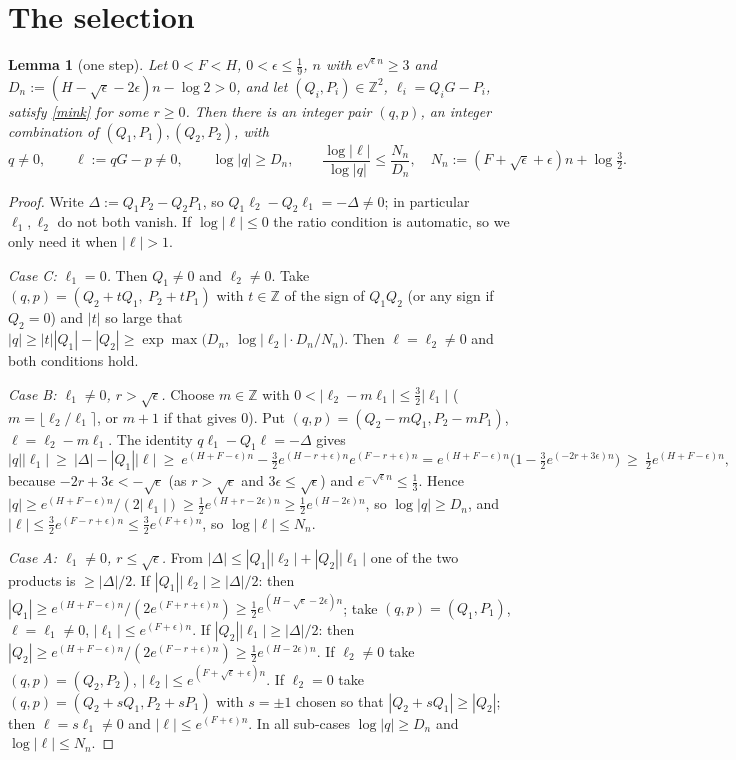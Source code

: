 \documentclass[11pt]{amsart}
\newtheorem{lemma}[theorem]{Lemma}
\theoremstyle{remark}
\newcommand{\Z}{\mathbb Z}\newcommand{\Q}{\mathbb Q}\newcommand{\R}{\mathbb R}
\begin{document}
\section{The selection}
\begin{lemma}[one step]\label{select}
Let $0<F<H$, $0<\epsilon\le\tfrac19$, $n$ with $e^{\sqrt\epsilon n}\ge3$ and $D_n:=(H-\sqrt\epsilon-2\epsilon)n-\log2>0$, and let $(Q_i,P_i)\in\Z^2$, $\ell_i=Q_iG-P_i$, satisfy \eqref{mink} for some $r\ge0$. Then there is an integer pair $(q,p)$, an integer combination of $(Q_1,P_1),(Q_2,P_2)$, with
\[q\ne0,\qquad \ell:=qG-p\ne0,\qquad \log|q|\ge D_n,\qquad \frac{\log|\ell|}{\log|q|}\le\frac{N_n}{D_n},\quad N_n:=(F+\sqrt\epsilon+\epsilon)n+\log\tfrac32 .\]
\end{lemma}
\begin{proof}
Write $\Delta:=Q_1P_2-Q_2P_1$, so $Q_1\ell_2-Q_2\ell_1=-\Delta\ne0$; in particular $\ell_1,\ell_2$ do not both vanish. If $\log|\ell|\le0$ the ratio condition is automatic, so we only need it when $|\ell|>1$.

\emph{Case C: $\ell_1=0$.} Then $Q_1\ne0$ and $\ell_2\ne0$. Take $(q,p)=(Q_2+tQ_1,\ P_2+tP_1)$ with $t\in\Z$ of the sign of $Q_1Q_2$ (or any sign if $Q_2=0$) and $|t|$ so large that $|q|\ge|t||Q_1|-|Q_2|\ge\exp\max\bigl(D_n,\ \log|\ell_2|\cdot D_n/N_n\bigr)$. Then $\ell=\ell_2\ne0$ and both conditions hold.

\emph{Case B: $\ell_1\ne0$, $r>\sqrt\epsilon$.} Choose $m\in\Z$ with $0<|\ell_2-m\ell_1|\le\tfrac32|\ell_1|$ ($m=\lfloor\ell_2/\ell_1\rceil$, or $m+1$ if that gives $0$). Put $(q,p)=(Q_2-mQ_1,P_2-mP_1)$, $\ell=\ell_2-m\ell_1$. The identity $q\ell_1-Q_1\ell=-\Delta$ gives
\[|q||\ell_1|\ \ge\ |\Delta|-|Q_1||\ell|\ \ge\ e^{(H+F-\epsilon)n}-\tfrac32e^{(H-r+\epsilon)n}e^{(F-r+\epsilon)n}=e^{(H+F-\epsilon)n}\bigl(1-\tfrac32e^{(-2r+3\epsilon)n}\bigr)\ \ge\ \tfrac12e^{(H+F-\epsilon)n},\]
because $-2r+3\epsilon<-\sqrt\epsilon$ (as $r>\sqrt\epsilon$ and $3\epsilon\le\sqrt\epsilon$) and $e^{-\sqrt\epsilon n}\le\tfrac13$. Hence $|q|\ge e^{(H+F-\epsilon)n}/(2|\ell_1|)\ge\tfrac12e^{(H+r-2\epsilon)n}\ge\tfrac12e^{(H-2\epsilon)n}$, so $\log|q|\ge D_n$, and $|\ell|\le\tfrac32e^{(F-r+\epsilon)n}\le\tfrac32e^{(F+\epsilon)n}$, so $\log|\ell|\le N_n$.

\emph{Case A: $\ell_1\ne0$, $r\le\sqrt\epsilon$.} From $|\Delta|\le|Q_1||\ell_2|+|Q_2||\ell_1|$ one of the two products is $\ge|\Delta|/2$.
If $|Q_1||\ell_2|\ge|\Delta|/2$: then $|Q_1|\ge e^{(H+F-\epsilon)n}/(2e^{(F+r+\epsilon)n})\ge\tfrac12e^{(H-\sqrt\epsilon-2\epsilon)n}$; take $(q,p)=(Q_1,P_1)$, $\ell=\ell_1\ne0$, $|\ell_1|\le e^{(F+\epsilon)n}$.
If $|Q_2||\ell_1|\ge|\Delta|/2$: then $|Q_2|\ge e^{(H+F-\epsilon)n}/(2e^{(F-r+\epsilon)n})\ge\tfrac12e^{(H-2\epsilon)n}$. If $\ell_2\ne0$ take $(q,p)=(Q_2,P_2)$, $|\ell_2|\le e^{(F+\sqrt\epsilon+\epsilon)n}$. If $\ell_2=0$ take $(q,p)=(Q_2+sQ_1,P_2+sP_1)$ with $s=\pm1$ chosen so that $|Q_2+sQ_1|\ge|Q_2|$; then $\ell=s\ell_1\ne0$ and $|\ell|\le e^{(F+\epsilon)n}$.
In all sub-cases $\log|q|\ge D_n$ and $\log|\ell|\le N_n$.
\end{proof}
\end{document}
